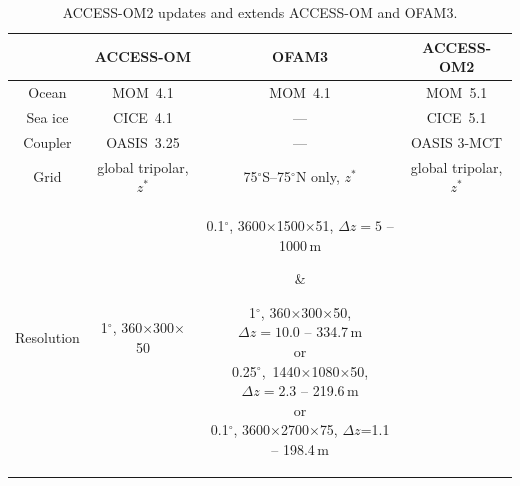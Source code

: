 \documentclass[11pt]{article}
\begin{document}
\begin{table}%
\caption{ACCESS-OM2 updates and extends ACCESS-OM and OFAM3.}
\begin{center}
\begin{tabular}{|c|c|c|c|}
\hline
& \textbf{ACCESS-OM} & \textbf{OFAM3} & \textbf{ACCESS-OM2}\\
\hline
Ocean & MOM~4.1 & MOM~4.1 & MOM~5.1\\
Sea ice & CICE~4.1 & --- & CICE~5.1\\
Coupler & OASIS~3.25 & --- & OASIS 3-MCT\\
Grid & global tripolar, $z^*$ & 75$^\circ$S--75$^\circ$N only, $z^*$ & global tripolar, $z^*$\\[2ex]
Resolution & 
1$^\circ$, 360$\times$300$\times$50 & 
\parbox[][][c]{22ex}{%
0.1$^\circ$, 3600$\times$1500$\times$51, $\Delta z=5$ -- 1000\,m 
} &
\parbox[][][c]{22ex}{%
1$^\circ$, 360$\times$300$\times$50,\\$\Delta z=10.0$ -- 334.7\,m\\
or\\0.25$^\circ$,~1440$\times$1080$\times$50,\\$\Delta z=2.3$ -- 219.6\,m\\
or\\0.1$^\circ$, 3600$\times$2700$\times$75, $\Delta z$=1.1 -- 198.4\,m\\[-1ex]}\\
\hline
\end{tabular}
\end{center}
\label{T:access-om-ofam3-access-om2}
\end{table}
\end{document}
